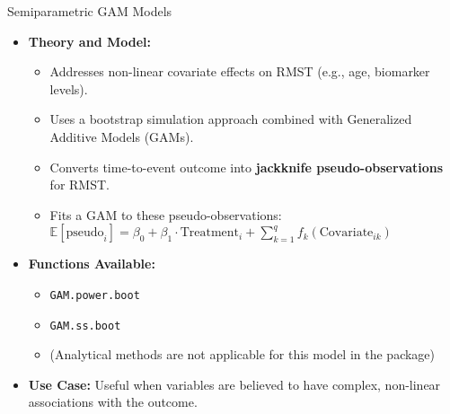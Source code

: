 \documentclass{beamer}
\begin{document}
\begin{frame}{Semiparametric GAM Models}
\begin{itemize}
    \item \textbf{Theory and Model:}
    \begin{itemize}
        \item Addresses non-linear covariate effects on RMST (e.g., age, biomarker levels).
        \item Uses a bootstrap simulation approach combined with Generalized Additive Models (GAMs).
        \item Converts time-to-event outcome into \textbf{jackknife pseudo-observations} for RMST.
        \item Fits a GAM to these pseudo-observations: $\mathbb{E}[\text{pseudo}_i] = \beta_0 + \beta_1 \cdot \text{Treatment}_i + \sum_{k=1}^{q} f_k(\text{Covariate}_{ik})$
    \end{itemize}
    \item \textbf{Functions Available:}
    \begin{itemize}
        \item \texttt{GAM.power.boot}
        \item \texttt{GAM.ss.boot}
        \item (Analytical methods are not applicable for this model in the package)
    \end{itemize}
    \item \textbf{Use Case:} Useful when variables are believed to have complex, non-linear associations with the outcome.
\end{itemize}
\end{frame}
\end{document}
